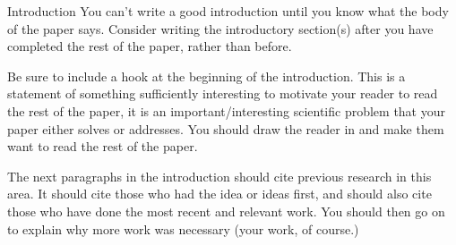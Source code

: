 
\iffalse
\subsection{Activation Based Pruning - Fully Connected Layers} \label{sec:activation-based-pruning-convolution}
Activation based pruning, works by looking at individual values in layers, and prunes the layer and corresponding weight row/columns completely. To visualize this, we will assume that the fully connected layers we have defined are, trained to some extent, and activated using ReLU activations. With this definition, if we apply our dataset and count the number of activations in $\mathbf{l_1}$ and $\mathbf{l_2}$, we may realize that there are some neurons that are not being activated at all. By removing these neurons from the layers, we can reduce the number of operations. This removal operation is done by removing neurons based on their activations. 
\todoin{add figure to show what happens when we prune}

\subsection{Activation Based Pruning - Convolution and Deconvolutions}
\todoin{Put references for conv and deconv operations. }
In theory, convolution operation is a matrix multiplication applied on a sliding window. Thus, counting the output feature activations of a convolution operation, we can apply activation based pruning. 

\subsection{Second Order Derivatives (Fischer Information Matrix)}
\fi


\iffalse
Introduction
You can't write a good introduction until you know what the body of the paper says. Consider writing the introductory section(s) after you have completed the rest of the paper, rather than before.

Be sure to include a hook at the beginning of the introduction. This is a statement of something sufficiently interesting to motivate your reader to read the rest of the paper, it is an important/interesting scientific problem that your paper either solves or addresses. You should draw the reader in and make them want to read the rest of the paper.

The next paragraphs in the introduction should cite previous research in this area. It should cite those who had the idea or ideas first, and should also cite those who have done the most recent and relevant work. You should then go on to explain why more work was necessary (your work, of course.)
 
